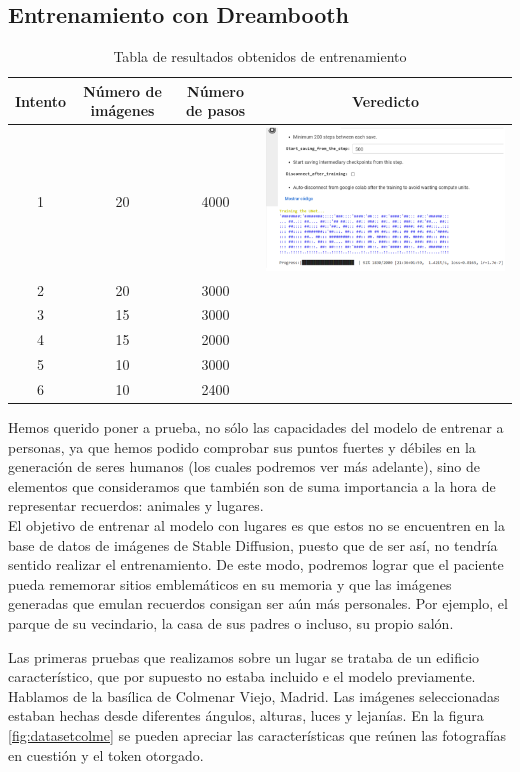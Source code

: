 \subsection{Entrenamiento con Dreambooth}
\usepackage{graphicx}
\begin{table}
	\centering
	\begin{tabular}{c|c|c|c}
		\textbf{Intento} & \textbf{Número de imágenes} & \textbf{Número de pasos} & \textbf{Veredicto} \\
		\hline\hline
		1 & 20 & 4000 & \includegraphics[width = 0.3
			\textwidth]{Imagenes/Vectorial/dreambooth.png}\\
		2 & 20 & 3000 & \\
		3 & 15 & 3000 & \\
		4 & 15 & 2000 & \\
		5 & 10 & 3000 & \\
		6 & 10 & 2400 & \\
		\hline
	\end{tabular}
	\caption{Tabla de resultados obtenidos de entrenamiento}
	\label{tab:resultadosentrenamiento}
\end{table}


Hemos querido poner a prueba, no sólo las capacidades del modelo de entrenar a personas, ya que hemos podido comprobar sus puntos fuertes y débiles en la generación de seres humanos (los cuales podremos ver más adelante), sino de elementos que consideramos que también son de suma importancia a la hora de representar recuerdos: animales y lugares. \\

El objetivo de entrenar al modelo con lugares es que estos no se encuentren en la base de datos de imágenes de Stable Diffusion, puesto que de ser así, no tendría sentido realizar el entrenamiento. De este modo, podremos lograr que el paciente pueda rememorar sitios emblemáticos en su memoria y que las imágenes generadas que emulan recuerdos consigan ser aún más personales. Por ejemplo, el parque de su vecindario, la casa de sus padres o incluso, su propio salón. 

Las primeras pruebas que realizamos sobre un lugar se trataba de un edificio característico, que por supuesto no estaba incluido e el modelo previamente. Hablamos de la basílica de Colmenar Viejo, Madrid. Las imágenes seleccionadas estaban hechas desde diferentes ángulos, alturas, luces y lejanías. En la figura \ref{fig:datasetcolme} se pueden apreciar las características que reúnen las fotografías en cuestión y el token otorgado.

